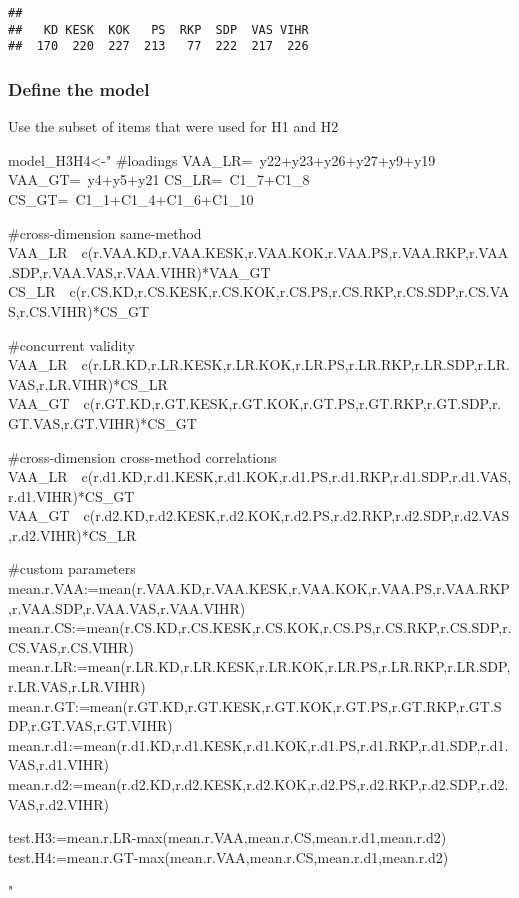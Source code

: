 \documentclass[
]{article}
\newenvironment{Shaded}{\begin{snugshade}}{\end{snugshade}}
\newcommand{\NormalTok}[1]{#1}
\newcommand{\StringTok}[1]{\textcolor[rgb]{0.31,0.60,0.02}{#1}}
\begin{document}
\begin{verbatim}
## 
##   KD KESK  KOK   PS  RKP  SDP  VAS VIHR 
##  170  220  227  213   77  222  217  226
\end{verbatim}

\hypertarget{define-the-model-1}{%
\subsubsection{Define the model}\label{define-the-model-1}}

Use the subset of items that were used for H1 and H2

\begin{Shaded}
\begin{Highlighting}[]
\NormalTok{model_H3H4<-}\StringTok{"}
\StringTok{#loadings}
\StringTok{VAA_LR=~y22+y23+y26+y27+y9+y19}
\StringTok{VAA_GT=~y4+y5+y21}
\StringTok{CS_LR=~C1_7+C1_8}
\StringTok{CS_GT=~C1_1+C1_4+C1_6+C1_10}

\StringTok{#cross-dimension same-method}
\StringTok{VAA_LR~~c(r.VAA.KD,r.VAA.KESK,r.VAA.KOK,r.VAA.PS,r.VAA.RKP,r.VAA.SDP,r.VAA.VAS,r.VAA.VIHR)*VAA_GT}
\StringTok{CS_LR~~c(r.CS.KD,r.CS.KESK,r.CS.KOK,r.CS.PS,r.CS.RKP,r.CS.SDP,r.CS.VAS,r.CS.VIHR)*CS_GT}

\StringTok{#concurrent validity}
\StringTok{VAA_LR~~c(r.LR.KD,r.LR.KESK,r.LR.KOK,r.LR.PS,r.LR.RKP,r.LR.SDP,r.LR.VAS,r.LR.VIHR)*CS_LR}
\StringTok{VAA_GT~~c(r.GT.KD,r.GT.KESK,r.GT.KOK,r.GT.PS,r.GT.RKP,r.GT.SDP,r.GT.VAS,r.GT.VIHR)*CS_GT}

\StringTok{#cross-dimension cross-method correlations}
\StringTok{VAA_LR~~c(r.d1.KD,r.d1.KESK,r.d1.KOK,r.d1.PS,r.d1.RKP,r.d1.SDP,r.d1.VAS,r.d1.VIHR)*CS_GT}
\StringTok{VAA_GT~~c(r.d2.KD,r.d2.KESK,r.d2.KOK,r.d2.PS,r.d2.RKP,r.d2.SDP,r.d2.VAS,r.d2.VIHR)*CS_LR}

\StringTok{#custom parameters}
\StringTok{mean.r.VAA:=mean(r.VAA.KD,r.VAA.KESK,r.VAA.KOK,r.VAA.PS,r.VAA.RKP,r.VAA.SDP,r.VAA.VAS,r.VAA.VIHR)}
\StringTok{mean.r.CS:=mean(r.CS.KD,r.CS.KESK,r.CS.KOK,r.CS.PS,r.CS.RKP,r.CS.SDP,r.CS.VAS,r.CS.VIHR)}
\StringTok{mean.r.LR:=mean(r.LR.KD,r.LR.KESK,r.LR.KOK,r.LR.PS,r.LR.RKP,r.LR.SDP,r.LR.VAS,r.LR.VIHR)}
\StringTok{mean.r.GT:=mean(r.GT.KD,r.GT.KESK,r.GT.KOK,r.GT.PS,r.GT.RKP,r.GT.SDP,r.GT.VAS,r.GT.VIHR)}
\StringTok{mean.r.d1:=mean(r.d1.KD,r.d1.KESK,r.d1.KOK,r.d1.PS,r.d1.RKP,r.d1.SDP,r.d1.VAS,r.d1.VIHR)}
\StringTok{mean.r.d2:=mean(r.d2.KD,r.d2.KESK,r.d2.KOK,r.d2.PS,r.d2.RKP,r.d2.SDP,r.d2.VAS,r.d2.VIHR)}

\StringTok{test.H3:=mean.r.LR-max(mean.r.VAA,mean.r.CS,mean.r.d1,mean.r.d2)}
\StringTok{test.H4:=mean.r.GT-max(mean.r.VAA,mean.r.CS,mean.r.d1,mean.r.d2)}


\StringTok{"}
\end{Highlighting}
\end{Shaded}
\end{document}
